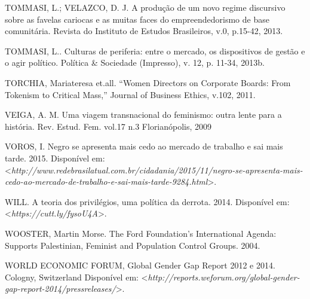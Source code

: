 \begin{Parskip}
TOMMASI, L.; VELAZCO, D. J. A produção de um novo regime discursivo
sobre as favelas cariocas e as muitas faces do empreendedorismo de base
comunitária. Revista do Instituto de Estudos Brasileiros, v.0, p.15-42,
2013.

TOMMASI, L.. Culturas de periferia: entre o mercado, os dispositivos de
gestão e o agir político. Política \& Sociedade (Impresso), v. 12, p.
11-34, 2013b.

TORCHIA, Mariateresa et.all. ``Women Directors on Corporate Boards: From
Tokenism to Critical Mass,'' Journal of Business Ethics, v.102, 2011.

VEIGA, A. M. Uma viagem transnacional do feminismo: outra lente para a
história. Rev. Estud. Fem. vol.17 n.3 Florianópolis, 2009

VOROS, I. Negro se apresenta mais cedo ao mercado de trabalho e sai mais
tarde. 2015.
Disponível em: \textless{}\emph{http://www.redebrasilatual.com.br/cidadania/2015/11/negro-se-apresenta-mais-cedo-ao-mercado-de-trabalho-e-sai-mais-tarde-9284.html}\textgreater{}.

WILL. A teoria dos privilégios, uma política da derrota. 2014.
Disponível em: \textless{}\emph{https://cutt.ly/fysoU4A}\textgreater{}.

WOOSTER, Martin Morse. The Ford Foundation's International Agenda:
Supports Palestinian, Feminist and Population Control Groups. 2004.

WORLD ECONOMIC FORUM, Global Gender Gap Report 2012 e 2014. Cologny,
Switzerland
Disponível em: \textless{}\emph{http://reports.weforum.org/global-gender-gap-report-2014/pressreleases/}\textgreater{}.
\end{Parskip}